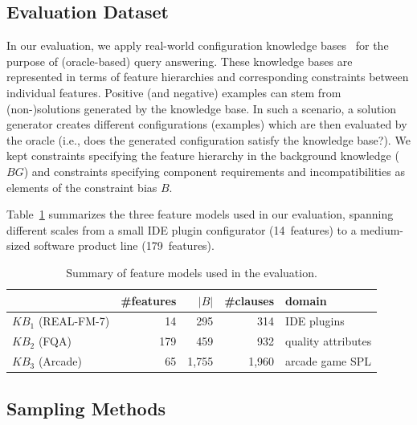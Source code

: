 \subsection{Evaluation Dataset}

In our evaluation, we apply real-world configuration knowledge bases~\cite{heradio2022} for
the purpose of (oracle-based) query answering. These knowledge bases are represented in
terms of feature hierarchies and corresponding constraints between individual features.
Positive (and negative) examples can stem from (non-)solutions generated by the knowledge base.
In such a scenario, a solution generator creates different configurations (examples) which are then evaluated by the oracle
(i.e., does the generated configuration satisfy the knowledge base?).
We kept constraints specifying the feature
hierarchy in the background knowledge ($BG$) and constraints specifying component
requirements and incompatibilities as elements of the constraint bias $B$.

Table~\ref{tab:fm_summary} summarizes the three feature models used in our evaluation, spanning different scales from a small IDE plugin configurator (14~features) to a medium-sized software product line (179~features).

\begin{table}[htbp]
\centering
\caption{Summary of feature models used in the evaluation.}
\label{tab:fm_summary}
\begin{tabular}{lrrrl}
\toprule
 & \#features & $|B|$ & \#clauses & domain \\
\midrule
$KB_1$ (REAL-FM-7) & 14 & 295 & 314 & IDE plugins \\
$KB_2$ (FQA)        & 179 & 459 & 932 & quality attributes \\
$KB_3$ (Arcade)     & 65 & 1{,}755 & 1{,}960 & arcade game SPL \\
\bottomrule
\end{tabular}
\end{table}

\subsection{Sampling Methods}


